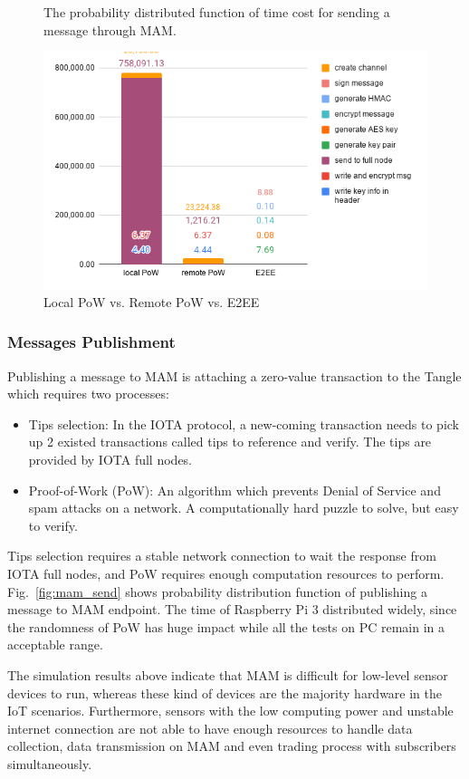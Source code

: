 \documentclass[conference]{IEEEtran}
\begin{document}
\begin{figure}[!htb]
  \caption{The probability distributed function of time cost for sending a message through MAM.}\label{fig:mam_send}
\endminipage\hfill
{}%
  \includegraphics[width=\linewidth]{rpi3_pow}
  \caption{Local PoW vs. Remote PoW vs. E2EE}\label{fig:rpi3_pow}
\endminipage
\end{figure}

\subsubsection{Messages Publishment}
Publishing a message to MAM is attaching a zero-value transaction to the Tangle which requires two processes:
\begin{itemize}
	\item	Tips selection: In the IOTA protocol, a new-coming transaction needs to pick up 2 existed transactions called tips to reference and verify. The tips are provided by IOTA full nodes.
	\item	Proof-of-Work (PoW): An algorithm which prevents Denial of Service and spam attacks on a network. A computationally hard puzzle to solve, but easy to verify.
\end{itemize}

Tips selection requires a stable network connection to wait the response from IOTA full nodes, and PoW requires enough computation resources to perform. Fig.~\ref{fig:mam_send} shows probability distribution function of publishing a message to MAM endpoint. The time of Raspberry Pi 3 distributed widely, since the randomness of PoW has huge impact while all the tests on PC remain in a acceptable range.

The simulation results above indicate that MAM is difficult for low-level sensor devices to run, whereas these kind of devices are the majority hardware in the IoT scenarios. Furthermore, sensors with the low computing power and unstable internet connection are not able to have enough resources to handle data collection, data transmission on MAM and even trading process with subscribers simultaneously. 
\end{document}
